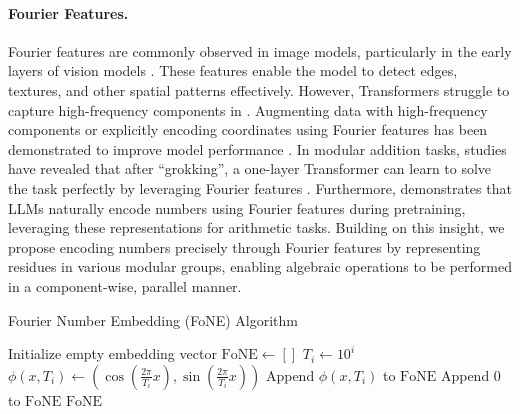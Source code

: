  


\paragraph{Fourier Features.}
Fourier features are commonly observed in image models, particularly in the early layers of vision models \cite{olshausen1997sparse,olah2020overview,fiquet2024polar}. These features enable the model to detect edges, textures, and other spatial patterns effectively. 
However, Transformers struggle to capture high-frequency components in \cite{bai2022improving,tancik2020fourier}. Augmenting data with high-frequency components or explicitly encoding coordinates using Fourier features has been demonstrated to improve model performance \cite{tancik2020fourier,he2024frequency}. 
In modular addition tasks, studies have revealed that after “grokking”, a one-layer Transformer can learn to solve the task perfectly by leveraging Fourier features \cite{nanda2023progress,gu2024fourier}. Furthermore, \citet{zhou2024pre}  demonstrates that LLMs naturally encode numbers using Fourier features during pretraining, leveraging these representations for arithmetic tasks. Building on this insight, we propose encoding numbers precisely through Fourier features by representing residues in various modular groups, enabling algebraic operations to be performed in a component-wise, parallel manner.

\ifdefined\isarxiv

\else
\begin{algorithm*}[!ht]
\caption{Fourier Number Embedding (FoNE) Algorithm}\label{alg:fne_algorithm_fixed}
    \begin{algorithmic}[1]
    \State Initialize empty embedding vector $\text{FoNE} \gets []$
     
        \State $T_i \gets 10^i$ 
        \State $\phi(x, T_i) \gets (\cos(\tfrac{2\pi}{T_i} x), \sin(\tfrac{2\pi}{T_i} x))$ 
        \State Append $\phi(x, T_i)$ to $\text{FoNE}$ 
    \EndFor
     
        \State Append $0$ to $\text{FoNE}$ 
    \EndWhile
    \State \Return $\text{FoNE}$ 
    \EndProcedure
    \end{algorithmic}
\end{algorithm*}
\fi

